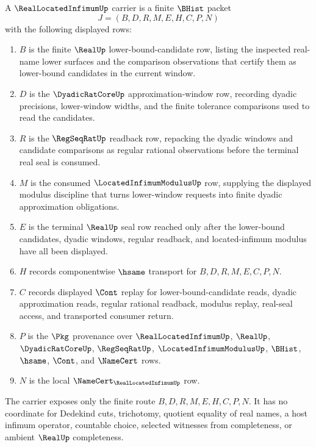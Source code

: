 \begin{definition}
\label{def:real-located-infimum-carrier}
A $\RealLocatedInfimumUp$ carrier is a finite $\BHist$ packet
$$
J=(B,D,R,M,E,H,C,P,N)
$$
with the following displayed rows:
\begin{enumerate}
\item $B$ is the finite $\RealUp$ lower-bound-candidate row, listing the inspected real-name lower surfaces and the comparison observations that certify them as lower-bound candidates in the current window.
\item $D$ is the $\DyadicRatCoreUp$ approximation-window row, recording dyadic precisions, lower-window widths, and the finite tolerance comparisons used to read the candidates.
\item $R$ is the $\RegSeqRatUp$ readback row, repacking the dyadic windows and candidate comparisons as regular rational observations before the terminal real seal is consumed.
\item $M$ is the consumed $\LocatedInfimumModulusUp$ row, supplying the displayed modulus discipline that turns lower-window requests into finite dyadic approximation obligations.
\item $E$ is the terminal $\RealUp$ seal row reached only after the lower-bound candidates, dyadic windows, regular readback, and located-infimum modulus have all been displayed.
\item $H$ records componentwise $\hsame$ transport for $B,D,R,M,E,C,P,N$.
\item $C$ records displayed $\Cont$ replay for lower-bound-candidate reads, dyadic approximation reads, regular rational readback, modulus replay, real-seal access, and transported consumer return.
\item $P$ is the $\Pkg$ provenance over $\RealLocatedInfimumUp$, $\RealUp$, $\DyadicRatCoreUp$, $\RegSeqRatUp$, $\LocatedInfimumModulusUp$, $\BHist$, $\hsame$, $\Cont$, and $\NameCert$ rows.
\item $N$ is the local $\NameCert_{\RealLocatedInfimumUp}$ row.
\end{enumerate}
The carrier exposes only the finite route $B,D,R,M,E,H,C,P,N$. It has no coordinate for Dedekind cuts, trichotomy, quotient equality of real names, a host infimum operator, countable choice, selected witnesses from completeness, or ambient $\RealUp$ completeness.
\end{definition}

